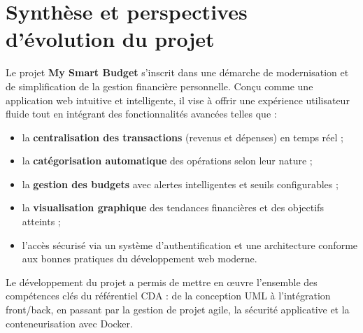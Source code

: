 \section{Synthèse et perspectives d’évolution du projet}

\begin{tcolorbox}[colback=gray!5!white,colframe=gray!60!black,title=\textbf{Synthèse du projet}]
Le projet \textbf{My Smart Budget} s’inscrit dans une démarche de modernisation et de simplification de la gestion financière personnelle.  
Conçu comme une application web intuitive et intelligente, il vise à offrir une expérience utilisateur fluide tout en intégrant des fonctionnalités avancées telles que :
\begin{itemize}
    \item la \textbf{centralisation des transactions} (revenus et dépenses) en temps réel ;
    \item la \textbf{catégorisation automatique} des opérations selon leur nature ;
    \item la \textbf{gestion des budgets} avec alertes intelligentes et seuils configurables ;
    \item la \textbf{visualisation graphique} des tendances financières et des objectifs atteints ;
    \item l’accès sécurisé via un système d’authentification et une architecture conforme aux bonnes pratiques du développement web moderne.
\end{itemize}

Le développement du projet a permis de mettre en œuvre l’ensemble des compétences clés du référentiel CDA :  
de la conception UML à l’intégration front/back, en passant par la gestion de projet agile, la sécurité applicative et la conteneurisation avec Docker.
\end{tcolorbox}

